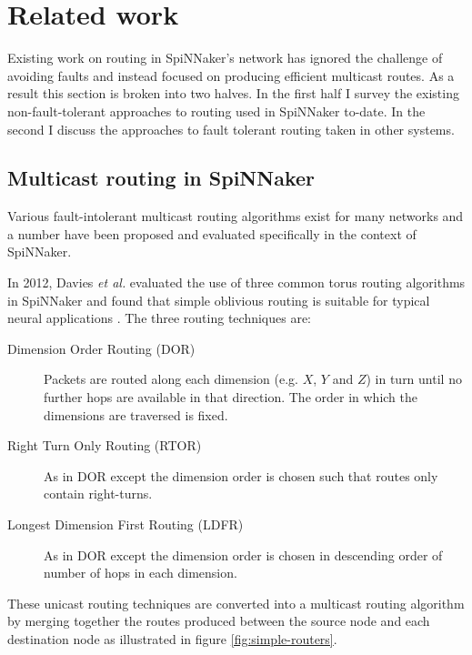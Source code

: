	\section{Related work}
		
		Existing work on routing in SpiNNaker's network has ignored the challenge
		of avoiding faults and instead focused on producing efficient multicast
		routes. As a result this section is broken into two halves. In the first
		half I survey the existing non-fault-tolerant approaches to routing used in
		SpiNNaker to-date. In the second I discuss the approaches to fault tolerant
		routing taken in other systems.
		
		\subsection{Multicast routing in SpiNNaker}
			
			Various fault-intolerant multicast routing algorithms exist for many
			networks and a number have been proposed and evaluated specifically in the
			context of SpiNNaker.
			
			In 2012, Davies \emph{et al.} evaluated the use of three common torus
			routing algorithms in SpiNNaker and found that simple oblivious routing is
			suitable for typical neural applications \cite{davies12}. The three
			routing techniques are:
			
			\begin{description}
				
				\item[Dimension Order Routing (DOR)] Packets are routed along each
				dimension (e.g. $X$, $Y$ and $Z$) in turn until no further hops are
				available in that direction.  The order in which the dimensions are
				traversed is fixed.
				
				\item[Right Turn Only Routing (RTOR)] As in DOR except the dimension
				order is chosen such that routes only contain right-turns.
				
				\item[Longest Dimension First Routing (LDFR)] As in DOR except the
				dimension order is chosen in descending order of number of hops in each
				dimension.
				
			\end{description}
			
			These unicast routing techniques are converted into a multicast routing
			algorithm by merging together the routes produced between the source node
			and each destination node as illustrated in figure
			\ref{fig:simple-routers}.
			
